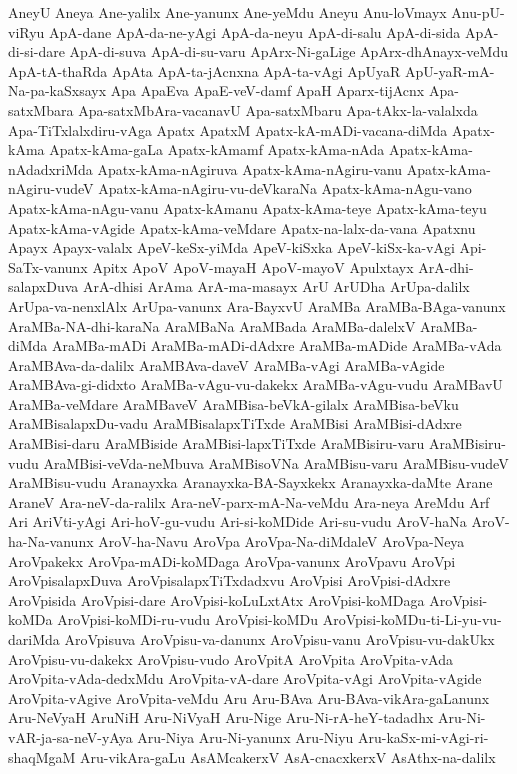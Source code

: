 {AneyU
Aneya
Ane-yalilx
Ane-yanunx
Ane-yeMdu
Aneyu
Anu-loVmayx
Anu-pU-viRyu
ApA-dane
ApA-da-ne-yAgi
ApA-da-neyu
ApA-di-salu
ApA-di-sida
ApA-di-si-dare
ApA-di-suva
ApA-di-su-varu
ApArx-Ni-gaLige
ApArx-dhAnayx-veMdu
ApA-tA-thaRda
ApAta
ApA-ta-jAcnxna
ApA-ta-vAgi
ApUyaR
ApU-yaR-mA-Na-pa-kaSxsayx
Apa
ApaEva
ApaE-veV-damf
ApaH
Aparx-tijAcnx
Apa-satxMbara
Apa-satxMbAra-vacanavU
Apa-satxMbaru
Apa-tAkx-la-valalxda
Apa-TiTxlalxdiru-vAga
Apatx
ApatxM
Apatx-kA-mADi-vacana-diMda
Apatx-kAma
Apatx-kAma-gaLa
Apatx-kAmamf
Apatx-kAma-nAda
Apatx-kAma-nAdadxriMda
Apatx-kAma-nAgiruva
Apatx-kAma-nAgiru-vanu
Apatx-kAma-nAgiru-vudeV
Apatx-kAma-nAgiru-vu-deVkaraNa
Apatx-kAma-nAgu-vano
Apatx-kAma-nAgu-vanu
Apatx-kAmanu
Apatx-kAma-teye
Apatx-kAma-teyu
Apatx-kAma-vAgide
Apatx-kAma-veMdare
Apatx-na-lalx-da-vana
Apatxnu
Apayx
Apayx-valalx
ApeV-keSx-yiMda
ApeV-kiSxka
ApeV-kiSx-ka-vAgi
Api-SaTx-vanunx
Apitx
ApoV
ApoV-mayaH
ApoV-mayoV
Apulxtayx
ArA-dhi-salapxDuva
ArA-dhisi
ArAma
ArA-ma-masayx
ArU
ArUDha
ArUpa-dalilx
ArUpa-va-nenxlAlx
ArUpa-vanunx
Ara-BayxvU
AraMBa
AraMBa-BAga-vanunx
AraMBa-NA-dhi-karaNa
AraMBaNa
AraMBada
AraMBa-dalelxV
AraMBa-diMda
AraMBa-mADi
AraMBa-mADi-dAdxre
AraMBa-mADide
AraMBa-vAda
AraMBAva-da-dalilx
AraMBAva-daveV
AraMBa-vAgi
AraMBa-vAgide
AraMBAva-gi-didxto
AraMBa-vAgu-vu-dakekx
AraMBa-vAgu-vudu
AraMBavU
AraMBa-veMdare
AraMBaveV
AraMBisa-beVkA-gilalx
AraMBisa-beVku
AraMBisalapxDu-vadu
AraMBisalapxTiTxde
AraMBisi
AraMBisi-dAdxre
AraMBisi-daru
AraMBiside
AraMBisi-lapxTiTxde
AraMBisiru-varu
AraMBisiru-vudu
AraMBisi-veVda-neMbuva
AraMBisoVNa
AraMBisu-varu
AraMBisu-vudeV
AraMBisu-vudu
Aranayxka
Aranayxka-BA-Sayxkekx
Aranayxka-daMte
Arane
AraneV
Ara-neV-da-ralilx
Ara-neV-parx-mA-Na-veMdu
Ara-neya
AreMdu
Arf
Ari
AriVti-yAgi
Ari-hoV-gu-vudu
Ari-si-koMDide
Ari-su-vudu
AroV-haNa
AroV-ha-Na-vanunx
AroV-ha-Navu
AroVpa
AroVpa-Na-diMdaleV
AroVpa-Neya
AroVpakekx
AroVpa-mADi-koMDaga
AroVpa-vanunx
AroVpavu
AroVpi
AroVpisalapxDuva
AroVpisalapxTiTxdadxvu
AroVpisi
AroVpisi-dAdxre
AroVpisida
AroVpisi-dare
AroVpisi-koLuLxtAtx
AroVpisi-koMDaga
AroVpisi-koMDa
AroVpisi-koMDi-ru-vudu
AroVpisi-koMDu
AroVpisi-koMDu-ti-Li-yu-vu-dariMda
AroVpisuva
AroVpisu-va-danunx
AroVpisu-vanu
AroVpisu-vu-dakUkx
AroVpisu-vu-dakekx
AroVpisu-vudo
AroVpitA
AroVpita
AroVpita-vAda
AroVpita-vAda-dedxMdu
AroVpita-vA-dare
AroVpita-vAgi
AroVpita-vAgide
AroVpita-vAgive
AroVpita-veMdu
Aru
Aru-BAva
Aru-BAva-vikAra-gaLanunx
Aru-NeVyaH
AruNiH
Aru-NiVyaH
Aru-Nige
Aru-Ni-rA-heY-tadadhx
Aru-Ni-vAR-ja-sa-neV-yAya
Aru-Niya
Aru-Ni-yanunx
Aru-Niyu
Aru-kaSx-mi-vAgi-ri-shaqMgaM
Aru-vikAra-gaLu
AsAMcakerxV
AsA-cnacxkerxV
AsAthx-na-dalilx
}
